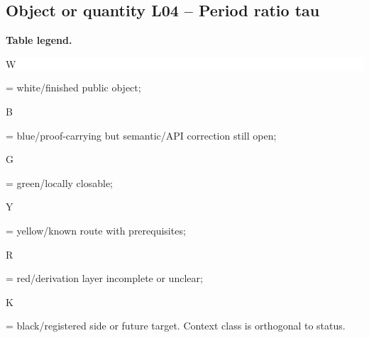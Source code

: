 \subsection*{Object or quantity L04 -- Period ratio tau}
\hypertarget{objproof:L04}{}
\par\smallskip\noindent\begin{minipage}{0.99\linewidth}\footnotesize\raggedright\textbf{Table legend.} \colorbox{white}{\strut W} = white/finished public object; \colorbox{cyan!20}{\strut B} = blue/proof-carrying but semantic/API correction still open; \colorbox{green!18}{\strut G} = green/locally closable; \colorbox{yellow!25}{\strut Y} = yellow/known route with prerequisites; \colorbox{red!20}{\strut R} = red/derivation layer incomplete or unclear; \colorbox{black!18}{\strut K} = black/registered side or future target. Context class is orthogonal to status.\end{minipage}\par\vspace{0.25em}
